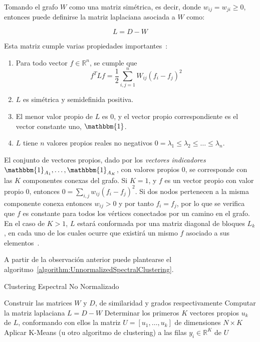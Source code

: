 Tomando el grafo $W$ como una matriz simétrica, es decir, donde $w_{ij}=w_{ji}\geq 0$, entonces puede definirse la matriz laplaciana asociada a $W$ como:

\begin{equation}
    \label{eq:laplacian-graph}
    L = D - W
\end{equation}

Esta matriz cumple varias propiedades importantes~\cite{Luxburg07}:

\begin{enumerate}
    \item Para todo vector $f\in \mathbb{R}^n$, se cumple que
    \[
        f^T Lf = \frac{1}{2}\sum_{i,j=1}^{n}{W_{ij}(f_i - f_j)^2}
    \]
    \item $L$ es simétrica y semidefinida positiva.
    \item El menor valor propio de $L$ es 0, y el vector propio correspondiente es el vector constante uno, $\mathbbm{1}$.
    \item $L$ tiene $n$ valores propios reales no negativos $0=\lambda_1 \leq \lambda_2 \leq \dots \leq \lambda_n$.
\end{enumerate}

El conjunto de vectores propios, dado por los \textit{vectores indicadores} $\mathbbm{1}_{A_1}, \dots, \mathbbm{1}_{A_K}$, con valores propios 0, se corresponde con las $K$ componentes conexas del grafo.
Si $K=1$, y $f$ es un vector propio con valor propio 0, entonces $0=\sum_{i,j}{w_{ij}(f_i - f_j)^2}$.
Si dos nodos pertenecen a la misma componente conexa entonces $w_{ij}>0$ y por tanto $f_i = f_j$, por lo que se verifica que $f$ es constante para todos los vértices conectados por un camino en el grafo.
En el caso de $K>1$, $L$ estará conformada por una matriz diagonal de bloques $L_k$, en cada uno de los cuales ocurre que existirá un mismo $f$ asociado a sus elementos~\cite{Luxburg07,Murphy12}.

A partir de la observación anterior puede plantearse el algoritmo~\ref{algorithm:UnnormalizedSpectralClustering}.

\begin{algorithm}
    \caption{Clustering Espectral No Normalizado}
    \label{algorithm:UnnormalizedSpectralClustering}
    Construir las matrices $W$ y $D$, de similaridad y grados respectivamente\;
    Computar la matriz laplaciana $L = D-W$\;
    Determinar los primeros $K$ vectores propios $u_k$ de $L$, conformando con ellos la matriz $U = [u_1,\dots,u_k]$ de dimensiones $N\times K$\;
    Aplicar K-Means (u otro algoritmo de clustering) a las filas $y_{i}\in \mathbb{R}^K$ de $U$\;
\end{algorithm}

